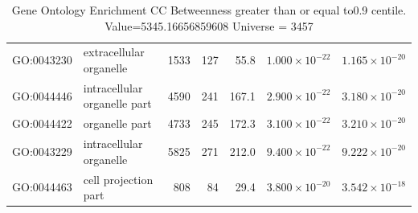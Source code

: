\begin{table}[ht]
\begin{tabular}{llrrrrr}
  GO:0043230 & extracellular organelle & 1533 & 127 & 55.8 & $1.000 \times 10^{-22}$ & $1.165 \times 10^{-20}$ \\ 
  GO:0044446 & intracellular organelle part & 4590 & 241 & 167.1 & $2.900 \times 10^{-22}$ & $3.180 \times 10^{-20}$ \\ 
  GO:0044422 & organelle part & 4733 & 245 & 172.3 & $3.100 \times 10^{-22}$ & $3.210 \times 10^{-20}$ \\ 
  GO:0043229 & intracellular organelle & 5825 & 271 & 212.0 & $9.400 \times 10^{-22}$ & $9.222 \times 10^{-20}$ \\ 
  GO:0044463 & cell projection part & 808 & 84 & 29.4 & $3.800 \times 10^{-20}$ & $3.542 \times 10^{-18}$ \\ 
   \hline
\end{tabular}
\caption{Gene Ontology Enrichment CC Betweenness  greater than or equal to0.9 centile.   Value=5345.16656859608 Universe = 3457} 
\label{tab:Gene Ontology Enrichment CC Betweenness  greater than or equal to0.9 centile.   Value=5345.16656859608 Universe = 3457}
\end{table}

